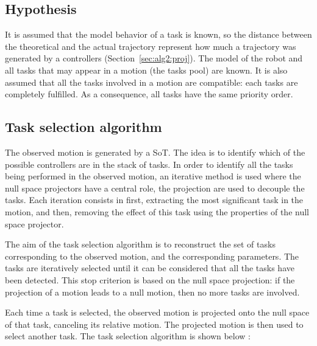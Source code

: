 \documentclass[letterpaper, 10pt, conference]{ieeeconf}      %
\begin{document}
\subsection{Hypothesis}
It is assumed that the model behavior of a task is known, so the distance between
the theoretical and the actual trajectory represent how much a trajectory
was generated by a controllers (Section~\ref{sec:alg2:proj}).
The model of the robot and all tasks that may appear in a motion (the tasks pool) are known.
It is also assumed that all the tasks involved in a motion are compatible:
each tasks are completely fulfilled. As a consequence, all
tasks have the same priority order. 

\subsection{Task selection algorithm} \label{sec:alg1:selec}
The observed motion is generated by a SoT.  The idea is to identify which of the possible controllers are in the stack of tasks. 
In order to identify all the
tasks being performed in the observed motion, an iterative method is used where
the null space projectors have a central role, the projection
are used to decouple the tasks.
Each iteration consists in first, extracting the most significant task in the motion,
and then, removing the effect of this task using the properties of the null space projector.

The aim of the task selection algorithm is to reconstruct the set of tasks corresponding
to the observed motion, and the corresponding parameters.
The tasks are iteratively selected until it can be considered that all the tasks
have been detected.
This stop criterion is based on the
null space projection: if the projection of a motion
leads to a null motion, then no more tasks are involved.

Each time a task is selected, the observed motion is projected
onto the null space of that task, canceling its relative motion. 
The projected motion is then used to select another task.
The task selection algorithm is shown below :

\newcommand{\shOUTPUT}{\textbf{Output: }}
\newcommand{\shINPUT}{\textbf{Input: }}
\end{document}
